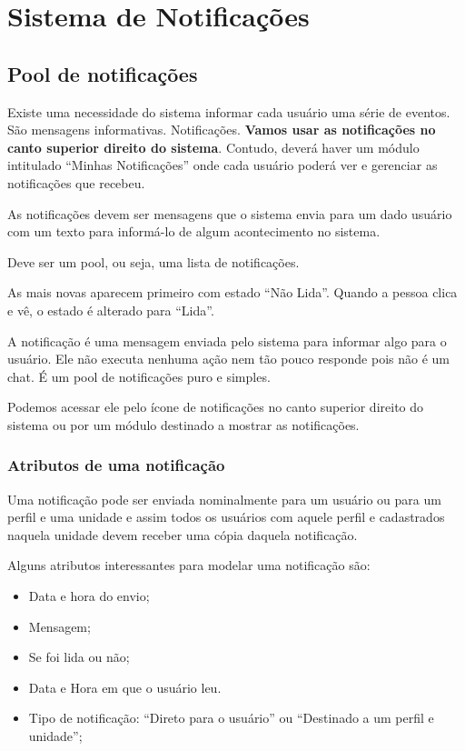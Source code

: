 \chapter{Sistema de Notificações}
\label{detalhes:modulos-notificacoes}

\section{Pool de notificações}

Existe uma necessidade do sistema informar cada usuário uma série de eventos. São mensagens informativas. Notificações. \textbf{Vamos usar as notificações no canto superior direito do sistema}. Contudo, deverá haver um módulo intitulado ``Minhas Notificações'' onde cada usuário poderá ver e gerenciar as notificações que recebeu.

As notificações devem ser mensagens que o sistema envia para um dado usuário com um texto para informá-lo de algum acontecimento no sistema.

Deve ser um pool, ou seja, uma lista de notificações. 

As mais novas aparecem primeiro com estado ``Não Lida''. Quando a pessoa clica e vê, o estado é alterado para ``Lida''.

A notificação é uma mensagem enviada pelo sistema para informar algo para o usuário. Ele não executa nenhuma ação nem tão pouco responde pois não é um chat. É um pool de notificações puro e simples.

Podemos acessar ele pelo ícone de notificações no canto superior direito do sistema ou por um módulo destinado a mostrar as notificações.

\subsection{Atributos de uma notificação}

Uma notificação pode ser enviada nominalmente para um usuário ou para um perfil e uma unidade e assim todos os usuários com aquele perfil e cadastrados naquela unidade devem receber uma cópia daquela notificação.

Alguns atributos interessantes para modelar uma notificação são:

\begin{itemize}
	\item Data e hora do envio;
	\item Mensagem;
	\item Se foi lida ou não;
	\item Data e Hora em que o usuário leu.
	\item Tipo de notificação: ``Direto para o usuário'' ou ``Destinado a um perfil e unidade'';
\end{itemize}

